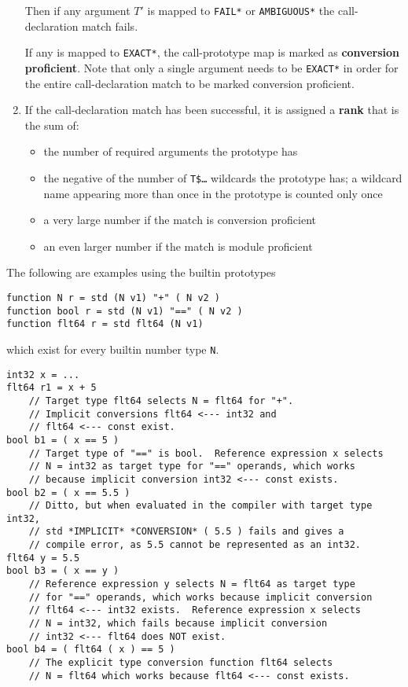 \documentclass[12pt]{article}
\newcommand{\key}[1]{{\rm \bfseries #1}}
\newenvironment{indpar}[1][0.3in]%
	{\begin{list}{}%
		     {\setlength{\itemsep}{0in}%
		      \setlength{\topsep}{0in}%
		      \setlength{\parsep}{1ex}%
		      \setlength{\labelwidth}{#1}%
		      \setlength{\leftmargin}{#1}%
		      \addtolength{\leftmargin}{\labelsep}}%
	 \item}%
	{\end{list}}
\begin{document}
\begin{enumerate}
Then if any argument $T'$ is mapped to {\tt *FAIL*} or {\tt *AMBIGUOUS*}
the call-declaration match fails.

If any is mapped to {\tt *EXACT*}, the call-prototype map is
marked as \key{conversion proficient}.  Note that only a single
argument needs to be {\tt *EXACT*} in order for the entire
call-declaration match to be marked conversion proficient.

\item\label{CALL-DECLARATION-RANK-COMPUTATION}
If the call-declaration match has been successful, it is assigned
a \key{rank} that is the sum of:
\begin{itemize}
\item the number of required arguments the prototype has
\item the negative of the number of {\tt T\$\ldots} wildcards
the prototype has; a wildcard name appearing more than once in
the prototype is counted only once
\item a very large number if the match is conversion proficient
\item an even larger number if the match is module proficient
\end{itemize}

\end{enumerate}

The following are examples using the builtin prototypes
\begin{indpar}
{\tt function N r = std (N v1) "+" ( N v2 )} \\
{\tt function bool r = std (N v1) "==" ( N v2 )} \\
{\tt function flt64 r = std flt64 (N v1)}
\end{indpar}
which exist for every builtin number type {\tt N}.
\begin{indpar}[1em]\begin{verbatim}
int32 x = ...
flt64 r1 = x + 5
    // Target type flt64 selects N = flt64 for "+".
    // Implicit conversions flt64 <--- int32 and
    // flt64 <--- const exist.
bool b1 = ( x == 5 )
    // Target type of "==" is bool.  Reference expression x selects
    // N = int32 as target type for "==" operands, which works
    // because implicit conversion int32 <--- const exists.
bool b2 = ( x == 5.5 )
    // Ditto, but when evaluated in the compiler with target type int32,
    // std *IMPLICIT* *CONVERSION* ( 5.5 ) fails and gives a
    // compile error, as 5.5 cannot be represented as an int32.
flt64 y = 5.5
bool b3 = ( x == y )
    // Reference expression y selects N = flt64 as target type
    // for "==" operands, which works because implicit conversion
    // flt64 <--- int32 exists.  Reference expression x selects
    // N = int32, which fails because implicit conversion
    // int32 <--- flt64 does NOT exist.
bool b4 = ( flt64 ( x ) == 5 )
    // The explicit type conversion function flt64 selects
    // N = flt64 which works because flt64 <--- const exists.
\end{verbatim}\end{indpar}
\end{document}
